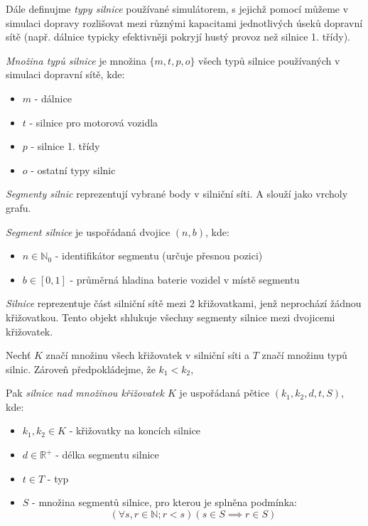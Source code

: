 Dále definujme \emph{typy silnice} používané simulátorem, s jejichž pomocí můžeme v
simulaci dopravy rozlišovat mezi různými kapacitami jednotlivých úseků dopravní sítě
(např. dálnice typicky efektivněji pokryjí hustý provoz než silnice 1. třídy).

\begin{defn}\label{def:mnoz_typu_silnice}
    \emph{Množina typů silnice} je množina $\{m, t, p, o\}$ všech typů 
    silnice používaných v simulaci dopravní sítě, kde:
    \begin{itemize}
        \item $m$ - dálnice
        \item $t$ - silnice pro motorová vozidla
        \item $p$ - silnice 1. třídy
        \item $o$ - ostatní typy silnic
    \end{itemize}
\end{defn}

\emph{Segmenty silnic} reprezentují vybrané body v silniční síti. A slouží jako
vrcholy grafu.

\begin{defn}\label{def:segment_silnice}
    \emph{Segment silnice} je uspořádaná dvojice $(n, b)$, kde:
    \begin{itemize}
        \item $n \in \mathbb{N}_0$ - identifikátor segmentu (určuje přesnou pozici)
        \item $b \in [0, 1]$ - průměrná hladina baterie vozidel v místě segmentu
    \end{itemize}
\end{defn}

\emph{Silnice} reprezentuje část silniční sítě mezi 2 křižovatkami, jenž neprochází
žádnou křižovatkou. Tento objekt shlukuje všechny segmenty silnice mezi dvojicemi
křižovatek.

\begin{defn}[Silnice]\label{def:silnice}
    Nechť $K$ značí množinu všech křižovatek v silniční síti a
    $T$ značí množinu typů silnic. Zároveň předpokládejme, že $k_1 < k_2$,  
    
    Pak \emph{silnice nad množinou křižovatek $K$} je uspořádaná
    pětice $(k_1, k_2, d, t, S)$, kde:
    \begin{itemize}
        \item $k_1, k_2 \in K$ - křižovatky na koncích silnice 
        \item $d \in \mathbb{R}^+$ - délka segmentu silnice
        \item $t \in T$ - typ
        \item $S$ - množina segmentů silnice, pro kterou je splněna podmínka: 
        $$(\forall{s, r} \in \mathbb{N}; r < s)(s \in S \implies r \in S)$$
    \end{itemize}
\end{defn}

